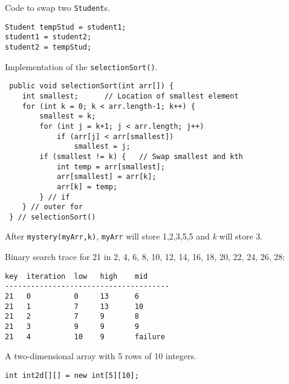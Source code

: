 \begin{ANS}
\item  Code to swap two {\tt Student}s.

\begin{jjjlisting}
\begin{lstlisting}
Student tempStud = student1;
student1 = student2;
student2 = tempStud;
\end{lstlisting}
\end{jjjlisting}

\item Implementation of the {\tt selectionSort()}.

\begin{jjjlisting}
\begin{lstlisting}
 public void selectionSort(int arr[]) {
    int smallest;      // Location of smallest element
    for (int k = 0; k < arr.length-1; k++) {  
        smallest = k;
        for (int j = k+1; j < arr.length; j++) 
            if (arr[j] < arr[smallest]) 
                smallest = j;
        if (smallest != k) {   // Swap smallest and kth
            int temp = arr[smallest];      
            arr[smallest] = arr[k];	
            arr[k] = temp;
        } // if
    } // outer for
 } // selectionSort()

\end{lstlisting}
\end{jjjlisting}

\item  After {\tt mystery(myArr,k)}, {\tt myArr} will store 1,2,3,5,5 and {\it k} will store 3.


\item  Binary search trace for 21 in  2, 4, 6, 8, 10, 12, 14, 16, 18, 20, 22, 24, 26, 28:

\begin{jjjlisting}
\begin{lstlisting}
key  iteration  low   high    mid
--------------------------------------
21   0          0     13      6
21   1          7     13      10
21   2          7     9       8
21   3          9     9       9
21   4          10    9       failure
\end{lstlisting}
\end{jjjlisting}

\item  A two-dimensional array with 5 rows of 10 integers.

\begin{jjjlisting}
\begin{lstlisting}
int int2d[][] = new int[5][10];
\end{lstlisting}
\end{jjjlisting}



\end{ANS}

